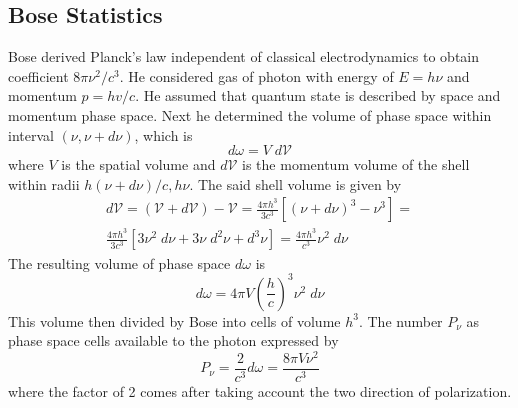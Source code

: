\documentclass[../../../Main.tex]{subfiles}
\begin{document}
\subsection*{Bose Statistics}
Bose derived Planck's law independent of classical electrodynamics to obtain coefficient $8\pi \nu^2/c^3$. He considered gas of photon with energy of $E=h\nu$ and momentum $p=hv/c$. He assumed that quantum state is described by space and momentum phase space. Next he determined the volume of phase space within interval $(\nu,\nu+d\nu)$, which is
\begin{equation*}
    d\omega=V\;d\mathcal{V}
\end{equation*}
where $V$ is the spatial volume and $d\mathcal{V}$ is the momentum volume of the shell within radii $h(\nu+d\nu)/c,h\nu$. The said shell volume is given by
\begin{multline*}
    d\mathcal{V}=(\mathcal{V}+d\mathcal{V})-\mathcal{V}=\frac{4\pi h^3}{3c^3}\left[(\nu+d\nu)^3-\nu^3\right] =\\ \frac{4\pi h^3}{3c^3}\left[3\nu^2\;d\nu+3\nu\;d^2\nu+d^3\nu\right]=\frac{4\pi h^3}{c^3}\nu^2\;d\nu
\end{multline*}
The resulting volume of phase space $d\omega$ is
\begin{equation*}
    d\omega=4\pi V\left(\frac{h}{c}\right)^3\nu^2\;d\nu
\end{equation*}
This volume then divided by Bose into cells of volume $h^3$. The number $P_\nu$ as phase space cells available to the photon expressed by
\begin{equation*}
    P_\nu=\frac{2}{c^3}d\omega=\frac{8\pi V\nu^2}{c^3}
\end{equation*}
where the factor of 2 comes after taking account the two direction of polarization. 
\end{document}
